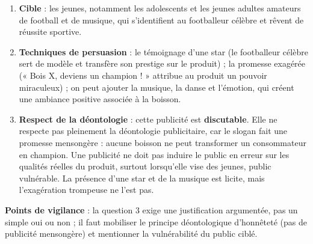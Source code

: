 \documentclass[11pt]{article}
\newcommand{\cle}[1]{{\popxbold\color{popdark}#1}}
\begin{document}
\begin{corrige}
\begin{enumerate}
\item \textbf{Cible} : les jeunes, notamment les adolescents et les jeunes adultes amateurs de football et de musique, qui s'identifient au footballeur célèbre et rêvent de réussite sportive.
\item \textbf{Techniques de persuasion} : le \cle{témoignage d'une star} (le footballeur célèbre sert de modèle et transfère son prestige sur le produit) ; la \cle{promesse exagérée} (« Bois X, deviens un champion ! » attribue au produit un pouvoir miraculeux) ; on peut ajouter la musique, la danse et l'émotion, qui créent une ambiance positive associée à la boisson.
\item \textbf{Respect de la déontologie} : cette publicité est \textbf{discutable}. Elle ne respecte pas pleinement la \cle{déontologie} publicitaire, car le slogan fait une promesse mensongère : aucune boisson ne peut transformer un consommateur en champion. Une publicité ne doit pas induire le public en erreur sur les qualités réelles du produit, surtout lorsqu'elle vise des jeunes, public vulnérable. La présence d'une star et de la musique est licite, mais l'exagération trompeuse ne l'est pas.
\end{enumerate}
\textbf{Points de vigilance} : la question 3 exige une justification argumentée, pas un simple oui ou non ; il faut mobiliser le principe déontologique d'honnêteté (pas de publicité mensongère) et mentionner la vulnérabilité du public ciblé.
\end{corrige}
\end{document}
